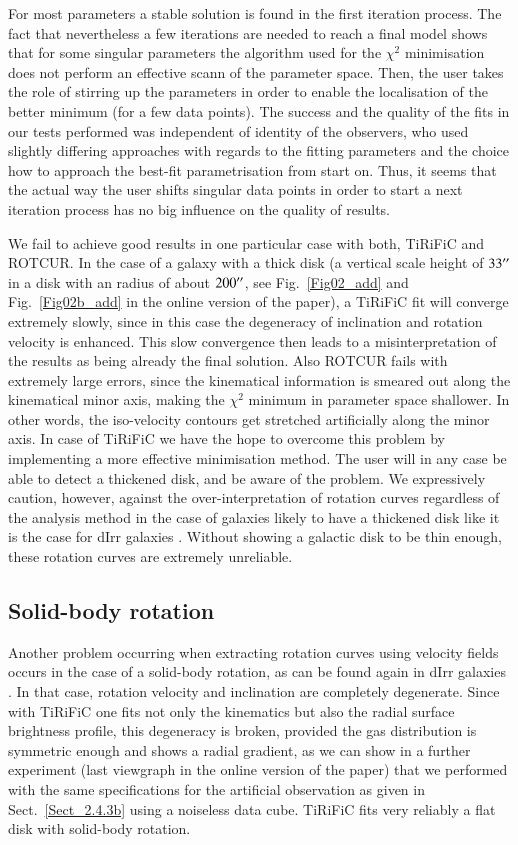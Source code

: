 \documentclass[oldversion]{aa}
\begin{document}
{For most parameters a stable solution is found in the first iteration
process. The fact that nevertheless a few iterations are needed to
reach a final model shows that for some singular parameters the
algorithm used for the $\chi^2$ minimisation does not perform an
effective scann of the parameter space. Then, the user takes the role
of stirring up the parameters in order to enable the localisation of
the better minimum (for a few data points). The success and the
quality of the fits in our tests performed was independent of identity
of the observers, who used slightly differing approaches with regards
to the fitting parameters and the choice how to approach the best-fit
parametrisation from start on. Thus, it seems that the actual way the
user shifts singular data points in order to start a next iteration
process has no big influence on the quality of results. 

We fail to achieve good results in one
particular case with both, TiRiFiC and ROTCUR. In the case of a galaxy with a thick disk
(a vertical scale height of $33\hbox{$^{\prime\prime}$}$ in a disk with an
 radius of about $200\hbox{$^{\prime\prime}$}$, see Fig.~\ref{Fig02_add} and Fig.~\ref{Fig02b_add} in the online version of the paper), a TiRiFiC fit will converge
extremely slowly, since in
this case the degeneracy of inclination and rotation velocity is
enhanced. This slow convergence then leads to a misinterpretation of the results as being already the final solution. Also ROTCUR fails with extremely large errors, since the
kinematical information is smeared out along the kinematical minor
axis, making the $\chi^2$ minimum in parameter space shallower. In
other words, the iso-velocity contours get stretched artificially along
the minor axis. In case of TiRiFiC we have the hope to overcome
this problem by implementing a more effective minimisation method. The
user will in any case be able to detect a thickened disk, and be
aware of the problem. We expressively caution, however, against the
over-interpretation of rotation curves regardless of the analysis
method in the case of galaxies likely to have a thickened disk like
it is the case for dIrr galaxies \citep[see
e.g. ][]{Staveley-Smith92,Bottema86,Walter99}. Without showing a
galactic disk to be thin enough, these rotation curves are extremely
unreliable.

\subsection{Solid-body rotation}
\label{Sect_2.4.3c}
Another problem occurring when extracting rotation curves using
velocity fields occurs in the case of a solid-body rotation, as can be
found again in dIrr galaxies \citep[e.g. ][]{Walter99}. In that case,
rotation velocity and inclination are completely degenerate. Since
with TiRiFiC one fits not only the kinematics but also the radial surface brightness profile, this degeneracy is broken, provided the gas distribution
is symmetric enough and shows a radial gradient, as we can show in a further
experiment (last viewgraph in the online version of the paper) that we performed with
the same specifications for the artificial observation as given in
Sect.~\ref{Sect_2.4.3b} using a noiseless data cube. TiRiFiC fits very
reliably a flat disk with solid-body rotation.
}
\end{document}
